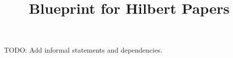 \documentclass{article}
\begin{document}
\title{Blueprint for Hilbert Papers}
\maketitle
TODO: Add informal statements and dependencies.
\end{document}
